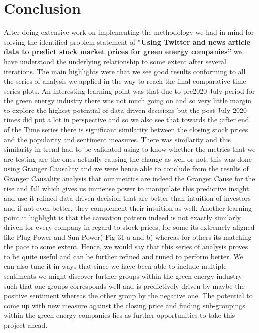 \documentclass[sigconf, nonacm]{acmart}
\begin{document}
\section{Conclusion}
After doing extensive work on implementing the methodology we had in mind for solving the identified problem statement of \textbf{"Using Twitter and news article data to predict stock market prices for green energy companies”} we have understood the underlying relationship to some extent after several iterations. The main highlights were that we see good results conforming to all the series of analysis we applied in the way to reach the final comparative time series plots. An interesting learning point was that due to pre2020-July period for the green energy industry there was not much going on and so very little margin to explore the highest potential of data driven decisions but the post July-2020 times did put a lot in perspective and so we also see that towards the ;after end of the Time series there is significant similarity between the closing stock prices and the popularity and sentiment measures. There was similarity and this similarity in trend had to be validated using to know whether the metrics that we are testing are the ones actually causing the change as well or not, this was done using Granger Causality and we were hence able to conclude from the results of Granger Causality analysis that our metrics are indeed the Granger Cause for the rise and fall which gives us immense power to manipulate this predictive insight and use it refined data driven decision that are better than intuition of investors and if not even better, they complement their intuition as well. Another learning point it highlight is that the causation pattern indeed is not exactly similarly driven for every company in regard to stock prices, for some its extremely aligned like Plug Power and Sun Power( Fig 31 a and b) whereas for others its matching the pace to some extent. Hence, we would say that this series of analysis proves to be quite useful and can be further refined and tuned to perform better. We can also tune it in ways that since we have been able to include multiple sentiments we might discover further groups within the green energy industry such that one groups corresponds well and is predictively driven by maybe the positive sentiment whereas the other group by the negative one. The potential to come up with new measure against the closing price and finding sub-groupings within the green energy companies lies as further opportunities to take this project ahead.





\end{document}
